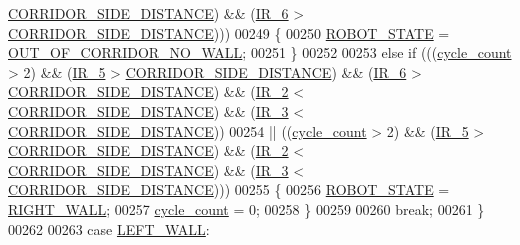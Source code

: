\begin{DoxyCode}
      \hyperlink{state__machine_8c_a201d56046ddf552d57b4862e0ec07a10}{CORRIDOR\_SIDE\_DISTANCE}) && (\hyperlink{state__machine_8c_a8c51bcd8b555e8c78fea79b88d28b55e}{IR\_6} > 
      \hyperlink{state__machine_8c_a201d56046ddf552d57b4862e0ec07a10}{CORRIDOR\_SIDE\_DISTANCE})))
00249             \{
00250                 \hyperlink{state__machine_8h_a5e5321a4a9085b83c8161454bf7a145c}{ROBOT\_STATE} = \hyperlink{state__machine_8h_a94b1da2e055fff4d143aa6aa891f79a9a24fb9d9ff0b7ac346a2527509a251125}{OUT\_OF\_CORRIDOR\_NO\_WALL};
00251             \}
00252             
00253             \textcolor{keywordflow}{else} \textcolor{keywordflow}{if} (((\hyperlink{state__machine_8c_a937f74a65988b9e22241ab3765b82c50}{cycle\_count} > 2) && (\hyperlink{state__machine_8c_ad00ba6cc1cf461bda7059f5aafc06142}{IR\_5} > 
      \hyperlink{state__machine_8c_a201d56046ddf552d57b4862e0ec07a10}{CORRIDOR\_SIDE\_DISTANCE}) && (\hyperlink{state__machine_8c_a8c51bcd8b555e8c78fea79b88d28b55e}{IR\_6} > 
      \hyperlink{state__machine_8c_a201d56046ddf552d57b4862e0ec07a10}{CORRIDOR\_SIDE\_DISTANCE}) && (\hyperlink{state__machine_8c_a07cfb2e201909d017a88a2a86c32cd4b}{IR\_2} < 
      \hyperlink{state__machine_8c_a201d56046ddf552d57b4862e0ec07a10}{CORRIDOR\_SIDE\_DISTANCE}) && (\hyperlink{state__machine_8c_a7831b71dc250258ecefe0e23f9920688}{IR\_3} < 
      \hyperlink{state__machine_8c_a201d56046ddf552d57b4862e0ec07a10}{CORRIDOR\_SIDE\_DISTANCE}))
00254                   || ((\hyperlink{state__machine_8c_a937f74a65988b9e22241ab3765b82c50}{cycle\_count} > 2) && (\hyperlink{state__machine_8c_ad00ba6cc1cf461bda7059f5aafc06142}{IR\_5} > 
      \hyperlink{state__machine_8c_a201d56046ddf552d57b4862e0ec07a10}{CORRIDOR\_SIDE\_DISTANCE}) && (\hyperlink{state__machine_8c_a07cfb2e201909d017a88a2a86c32cd4b}{IR\_2} < 
      \hyperlink{state__machine_8c_a201d56046ddf552d57b4862e0ec07a10}{CORRIDOR\_SIDE\_DISTANCE}) && (\hyperlink{state__machine_8c_a7831b71dc250258ecefe0e23f9920688}{IR\_3} < 
      \hyperlink{state__machine_8c_a201d56046ddf552d57b4862e0ec07a10}{CORRIDOR\_SIDE\_DISTANCE})))
00255             \{
00256                 \hyperlink{state__machine_8h_a5e5321a4a9085b83c8161454bf7a145c}{ROBOT\_STATE} = \hyperlink{state__machine_8h_a94b1da2e055fff4d143aa6aa891f79a9a47412afab845bb5d82848c742c5aa826}{RIGHT\_WALL};
00257                 \hyperlink{state__machine_8c_a937f74a65988b9e22241ab3765b82c50}{cycle\_count} = 0;
00258             \}
00259             
00260             \textcolor{keywordflow}{break};
00261         \}
00262         
00263         \textcolor{keywordflow}{case} \hyperlink{state__machine_8h_a94b1da2e055fff4d143aa6aa891f79a9a432a66e9cf59d20911b0409c4366bbfb}{LEFT\_WALL}:

\end{DoxyCode}
